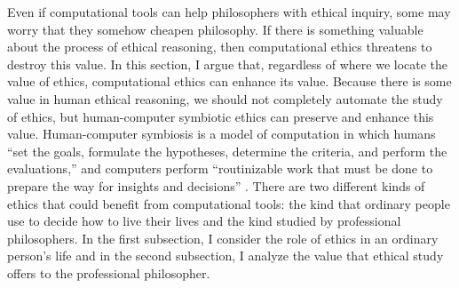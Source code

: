 %
\begin{isabellebody}%
%
%
\isadelimtheory
%
\endisadelimtheory
%
\isatagtheory
%
\endisatagtheory
{\isafoldtheory}%
%
\isadelimtheory
%
\endisadelimtheory
%
\isadelimdocument
%
\endisadelimdocument
%
\isatagdocument
%
\isamarkuptrue%
%
\endisatagdocument
{\isafolddocument}%
%
\isadelimdocument
%
\endisadelimdocument
%
\begin{isamarkuptext}%
Even if computational tools can help philosophers with ethical inquiry, some may worry that they
somehow cheapen philosophy. If there is something valuable about the process of ethical
reasoning, then computational ethics threatens to destroy this value. In this section, I argue that, 
regardless of where we locate the value of ethics, computational ethics can enhance its value. Because
there is some value in human ethical reasoning, we should not completely automate the study of ethics, but 
human-computer symbiotic ethics can preserve and enhance this value. Human-computer symbiosis is a model of computation
in which humans ``set the goals, formulate the hypotheses, determine the criteria, and perform the evaluations,”
and computers perform ``routinizable work that must be done to prepare the way for insights and decisions” \citep{licklider}.
There are two different kinds of ethics that
could benefit from computational tools: the kind that ordinary people use to decide how to live their 
lives and the kind studied by professional philosophers. In the first subsection, I consider the role of ethics 
in an ordinary person’s life and in the second subsection, I analyze the value that ethical study offers to 
the professional philosopher. 


\end{isamarkuptext}
\end{isabellebody}
